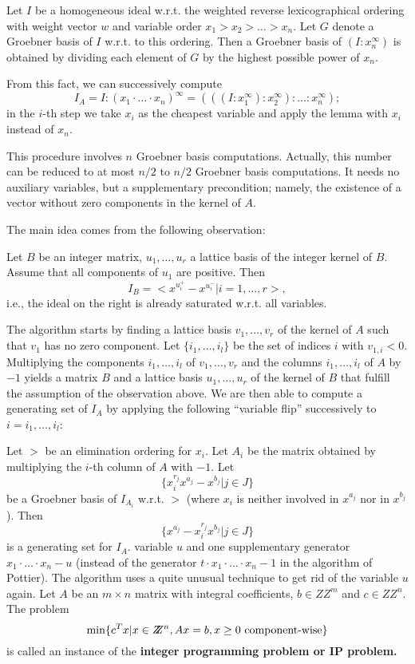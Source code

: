 Let $I$ be a homogeneous ideal w.r.t. the weighted reverse
lexicographical ordering with weight vector $w$ and variable order $x_1
> x_2 > \ldots > x_n$. Let $G$ denote a Groebner basis of $I$ w.r.t. to
this ordering.  Then a Groebner basis of $(I:x_n^\infty)$ is obtained by
dividing each element of $G$ by the highest possible power of $x_n$.

From this fact, we can successively compute
$$ I_A= I:(x_1\cdot\ldots\cdot x_n)^\infty
=(((I:x_1^\infty):x_2^\infty):\ldots :x_n^\infty); $$
in the $i$-th step we take $x_i$ as the cheapest variable and apply the
lemma with $x_i$ instead of $x_n$.

This procedure involves $n$ Groebner basis computations. Actually, this
number can be reduced to at most $n/2$
to $n/2$ Groebner basis
computations. It needs no auxiliary variables, but a supplementary
precondition; namely, the existence of a vector without zero components
in the kernel of $A$.

The main idea comes from the following observation:

Let $B$ be an integer matrix, $u_1,\ldots,u_r$ a lattice basis of the
integer kernel of $B$. Assume that all components of $u_1$ are
positive. Then
$$ I_B=<x^{u_i^+}-x^{u_i^-}|i=1,\ldots,r>, $$
i.e., the ideal on the right is already saturated w.r.t. all variables.

The algorithm starts by finding a lattice basis $v_1,\ldots,v_r$ of the
kernel of $A$ such that $v_1$ has no zero component. Let
$\{i_1,\ldots,i_l\}$ be the set of indices $i$ with
$v_{1,i}<0$. Multiplying the components $i_1,\ldots,i_l$ of
$v_1,\ldots,v_r$ and the columns $i_1,\ldots,i_l$ of $A$ by $-1$ yields
a matrix $B$ and a lattice basis $u_1,\ldots,u_r$ of the kernel of $B$
that fulfill the assumption of the observation above. We are then able
to compute a generating set of $I_A$ by applying the following
``variable flip'' successively to $i=i_1,\ldots,i_l$:

Let $>$ be an elimination ordering for $x_i$. Let $A_i$ be the matrix
obtained by multiplying the $i$-th column of $A$ with $-1$. Let
$$\{x_i^{r_j} x^{a_j} - x^{b_j} | j\in J \}$$
be a Groebner basis of $I_{A_i}$ w.r.t. $>$ (where $x_i$ is neither
involved in $x^{a_j}$ nor in $x^{b_j}$). Then
$$\{x^{a_j} - x_i^{r_j} x^{b_j} | j\in J \}$$
is a generating set for $I_A$.
variable $u$ and one supplementary generator $x_1\cdot\ldots\cdot x_n -
u$ (instead of the generator $t\cdot x_1\cdot\ldots\cdot x_n -1$ in
the algorithm of Pottier). The algorithm uses a quite unusual technique to
get rid of the variable $u$ again.
Let $A$ be an $m\times n$ matrix with integral coefficients, $b\in
Z\!\!\! Z^m$ and $c\in Z\!\!\! Z^n$. The problem
$$ \min\{c^T x | x\in Z\!\!\! Z^n, Ax=b, x\geq 0\hbox{
component-wise}\} $$
is called an instance of the \bf integer programming problem \rm or
\bf IP problem. \rm

